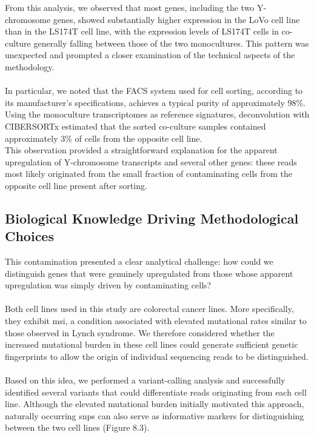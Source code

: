 \noindent
From this analysis, we observed that most genes, including the two Y-chromosome genes, showed substantially higher expression in the LoVo cell line than in the LS174T cell line, with the expression levels of LS174T cells in co-culture generally falling between those of the two monocultures. This pattern was unexpected and prompted a closer examination of the technical aspects of the methodology.
\\
\\
In particular, we noted that the FACS system used for cell sorting, according to its manufacturer’s specifications\cite{bd_biosciences_bd_nodate}, achieves a typical purity of approximately 98\%. Using the monoculture transcriptomes as reference signatures, deconvolution with CIBERSORTx\cite{chen_profiling_2018} estimated that the sorted co-culture samples contained approximately 3\% of cells from the opposite cell line.
\\
This observation provided a straightforward explanation for the apparent upregulation of Y-chromosome transcripts and several other genes: these reads most likely originated from the small fraction of contaminating cells from the opposite cell line present after sorting.

\subsection{Biological Knowledge Driving Methodological Choices}

This contamination presented a clear analytical challenge: how could we distinguish genes that were genuinely upregulated from those whose apparent upregulation was simply driven by contaminating cells?
\\
\\
Both cell lines used in this study are colorectal cancer lines. More specifically, they exhibit \gls{msi}\cite{linnekamp_consensus_2018}, a condition associated with elevated mutational rates similar to those observed in Lynch syndrome\cite{hao_distinct_2016}. We therefore considered whether the increased mutational burden in these cell lines could generate sufficient genetic fingerprints to allow the origin of individual sequencing reads to be distinguished.
\\
\\
Based on this idea, we performed a variant-calling analysis and successfully identified several variants that could differentiate reads originating from each cell line. Although the elevated mutational burden initially motivated this approach, naturally occurring \glspl{snp} can also serve as informative markers for distinguishing between the two cell lines (Figure 8.3).

